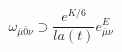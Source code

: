 \begin{equation}
\omega_{\bar\mu\bar0\nu}\supset \frac{e^{K/6}}{la(t)} e^E_{\bar\mu\nu}
\end{equation}

